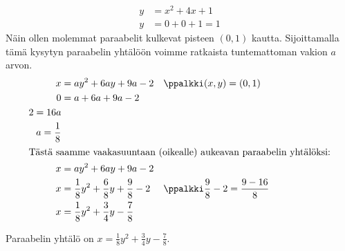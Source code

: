 \begin{esimerkki}
\begin{esimratk}
        \begin{align*}
        y &= x^2 + 4x +1\\
        y &= 0 + 0 + 1 = 1
        \end{align*}
        Näin ollen molemmat paraabelit kulkevat pisteen $(0,1)$ kautta. Sijoittamalla tämä kysytyn paraabelin yhtälöön voimme ratkaista tuntemattoman vakion $a$ arvon.
        \begin{align*}
        x &= ay^2 +6ay +9a -2 && \ppalkki (x,y) = (0,1) \\
        0 &= a +6a +9a -2 \\
        2 = 16a \\
        a = \frac{1}{8}\\
        \intertext{Tästä saamme vaakasuuntaan (oikealle) aukeavan paraabelin yhtälöksi:}
        x &= ay^2 +6ay +9a -2 \\
        x &= \frac{1}{8}y^2 + \frac{6}{8}y + \frac{9}{8} -2  && \ppalkki \frac{9}{8} -2 = \frac{9 - 16}{8}\\
        x &= \frac{1}{8}y^2 + \frac{3}{4}y - \frac{7}{8}
        \end{align*}
    \end{esimratk}
    \begin{esimvast} %
        Paraabelin yhtälö on $x = \frac{1}{8}y^2 + \frac{3}{4}y - \frac{7}{8}$.
    \end{esimvast}
\end{esimerkki}




